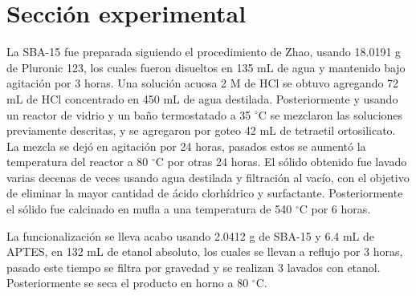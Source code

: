 \documentclass[fleqn, 12pt]{SelfArx}
\begin{document}
\section{Secci\'on experimental}
La SBA-15 fue preparada siguiendo el procedimiento de Zhao, usando 18.0191 g de Pluronic 123, los cuales fueron disueltos en 135 mL de agua y mantenido bajo agitaci\'on por 3 horas. Una soluci\'on acuosa 2 M de HCl se obtuvo agregando 72 mL de HCl concentrado en 450 mL de agua destilada. Posteriormente y usando un reactor de vidrio y un ba\~no termostatado a 35 $^\circ$C se mezclaron las soluciones previamente descritas, y se agregaron por goteo 42 mL de tetraetil ortosilicato. La mezcla se dej\'o en agitaci\'on por 24 horas, pasados estos se aument\'o la temperatura del reactor a 80 $^\circ$C por otras 24 horas. El s\'olido obtenido fue lavado varias decenas de veces usando agua destilada y filtraci\'on al vac\'io, con el objetivo de eliminar la mayor cantidad de \'acido clorh\'idrico y surfactante. Posteriormente el s\'olido fue calcinado en mufla a una temperatura de 540 $^\circ$C por 6 horas.

La funcionalizaci\'on se lleva acabo usando 2.0412 g de SBA-15 y 6.4 mL de APTES, en 132 mL de etanol absoluto, los cuales se llevan a reflujo por 3 horas, pasado este tiempo se filtra por gravedad y se realizan 3 lavados con etanol. Posteriormente se seca el producto en horno a 80 $^\circ$C.



\end{document}
